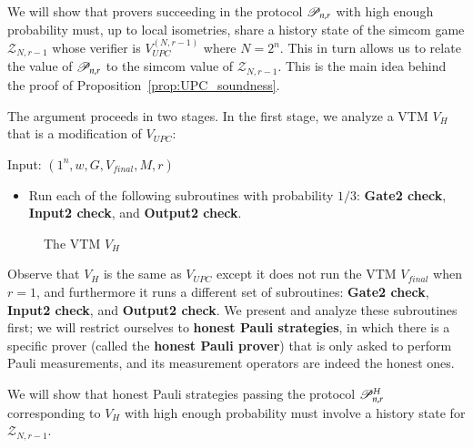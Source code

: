 We will show that provers succeeding in the protocol $\mathscr{P}_{n,r}$ with high enough probability must, up to local isometries, share a history state of the simcom game $\mathscr{Z}_{N,r-1}$ whose verifier is $V_{UPC}^{(N,r-1)}$ where $N = 2^n$. This in turn allows us to relate the value of $\mathscr{P}_{n,r}$ to the simcom value of $\mathscr{Z}_{N,r-1}$. This is the main idea behind the proof of Proposition~\ref{prop:UPC_soundness}.


The argument proceeds in two stages. In the first stage, we analyze a VTM $V_H$ that is a modification of $V_{UPC}$: 

\begin{center}
\begin{mdframed}
    Input: $(1^n,w,G,V_{final},M,r)$
    \begin{itemize}
    	\item Run each of the following subroutines with probability $1/3$: \textbf{Gate2 check}, \textbf{Input2 check}, and \textbf{Output2 check}.
		\end{itemize}
\end{mdframed}

\begin{figure}[H]
\caption{The VTM $V_H$}
\label{fig:vtm_h}
\end{figure}
\end{center}

Observe that $V_H$ is the same as $V_{UPC}$ except it does not run the VTM $V_{final}$ when $r = 1$, and furthermore it runs a different set of subroutines: \textbf{Gate2 check}, \textbf{Input2 check}, and \textbf{Output2 check}. We present and analyze these subroutines first; we will restrict ourselves to \textbf{honest Pauli strategies}, in which there is a specific prover (called the \textbf{honest Pauli prover}) that is only asked to perform Pauli measurements, and its measurement operators are indeed the honest ones.

We will show that honest Pauli strategies passing the protocol $\mathscr{P}^H_{n,r}$ corresponding to $V_H$ with high enough probability must involve a history state for $\mathscr{Z}_{N,r-1}$.


